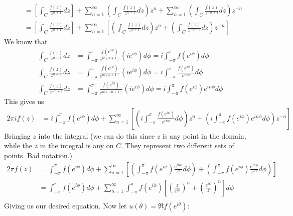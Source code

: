\documentclass[12pt, english]{book}
\makeatletter
\renewenvironment{proof}[1][\proofname]{\par
	\pushQED{\qed}%
	\normalfont \topsep6\p@\@plus6\p@\relax
	\list{}{%
		\settowidth{\leftmargin}{\itshape\proofname:\hskip\labelsep}%
		\setlength{\labelwidth}{0pt}%
		\setlength{\itemindent}{-\leftmargin}%
		}%
	\item[\hskip\labelsep\itshape#1\@addpunct{:}]\ignorespaces
	}{\popQED\endlist\@endpefalse}
\makeatother
\begin{document}
\begin{example}
\begin{proof}
{\begin{align*}
				&= \left[\int_{C} \frac{f(z)}{z^{n+1}} dz \right]
				 + \sum_{n=1}^{\infty} \left(\int_{C} \frac{f(z)}{z^{n+1}} dz \right) z^n
				 + \sum_{n=1}^{\infty} \left(\int_{C} \frac{f(z)}{z^{-n+1}} dz \right) z^{-n} \\
				&= \left[\int_{C} \frac{f(z)}{z^{n+1}} dz \right]
				+ \sum_{n=1}^{\infty} \left[ \left(\int_{C} \frac{f(z)}{z^{n+1}} dz \right) z^n
				+ \left(\int_{C} \frac{f(z)}{z^{-n+1}} dz \right) z^{-n} \right] 
			\end{align*}
			We know that 
			\begin{align*}
				\int_{C} \frac{f(z)}{z^{n+1}} dz 
				&= \int_{-\pi}^{\pi} \frac{f(e^{i\phi})}{e^{i\phi(n+1)}} (ie^{i\phi}) d\phi
				 = i \int_{-\pi}^{\pi} f(e^{i\phi}) d\phi \\
				\int_{C} \frac{f(z)}{z^{n+1}} dz
				&= \int_{-\pi}^{\pi}  \frac{f(e^{i\phi})}{e^{i\phi(n+1)}} (ie^{i\phi}) d\phi
				 = i \int_{-\pi}^{\pi} \frac{f(e^{i\phi})}{e^{in\phi}}  d\phi \\
				\int_{C} \frac{f(z)}{z^{-n+1}} dz
				&= \int_{-\pi}^{\pi}  \frac{f(e^{i\phi})}{e^{i\phi(-n+1)}} (ie^{i\phi}) d\phi
				 = i \int_{-\pi}^{\pi}  f(e^{i\phi}) e^{in\phi} d\phi
			\end{align*}
			This gives us
			\begin{align*}
				2\pi i f(z)
				&=  i \int_{-\pi}^{\pi} f(e^{i\phi}) d\phi + \sum_{n=1}^{\infty} \left[
				\left(  i \int_{-\pi}^{\pi} \frac{f(e^{i\phi})}{e^{in\phi}} d\phi \right) z^n 
				+ \left( i \int_{-\pi}^{\pi}  f(e^{i\phi}) e^{in\phi} d\phi \right) z^{-n}
				\right]
			\end{align*}
			Bringing \(z\) into the integral (we can do this since \(z\) is any point in the domain, while the \(z\) in the integral is any on \(C\). They represent two different sets of points. Bad notation.)
			\begin{align*}
				2\pi f(z)
				&= \int_{-\pi}^{\pi} f(e^{i\phi}) d\phi + \sum_{n=1}^{\infty} \left[
				\left( \int_{-\pi}^{\pi} f(e^{i\phi}) \frac{e^{in\phi}}{z^n} d\phi \right) 
				+ \left( \int_{-\pi}^{\pi}  f(e^{i\phi}) \frac{e^{in\phi}}{z^{-n}} d\phi \right) \right] \\
				&= \int_{-\pi}^{\pi} f(e^{i\phi}) d\phi + \sum_{n=1}^{\infty} 
				\int_{-\pi}^{\pi} f(e^{i\phi}) 
				\left[ \left( \frac{z}{e^{i\phi}} \right)^n 
				+  \left(\frac{e^{i\phi}}{z} \right)^n  \right] d\phi \\
			\end{align*}
			Giving us our desired equation. Now let \(u(\theta) = \Re{f(e^{i\theta})}\):
}
\end{proof}
\end{example}
\end{document}
